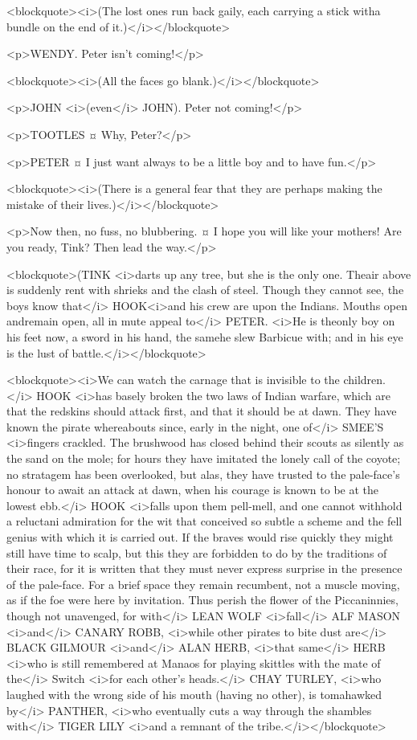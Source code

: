 <blockquote><i>(The lost ones run back gaily, each carrying a stick witha bundle on the end of it.)</i></blockquote>

<p>WENDY. Peter isn't coming!</p>

<blockquote><i>(All the faces go blank.)</i></blockquote>

<p>JOHN <i>(even</i> JOHN). Peter not coming!</p>

<p>TOOTLES ¤
Why, Peter?</p>

<p>PETER ¤
I just want always to be a little boy and to have fun.</p>

<blockquote><i>(There is a general fear that they are perhaps making the mistake of their lives.)</i></blockquote>

<p>Now then, no fuss, no blubbering.
¤
I hope you will like your mothers! Are you ready, Tink? Then lead the way.</p>

<blockquote>(TINK <i>darts up any tree, but she is the only one. Theair above is suddenly rent with shrieks and the clash of steel. Though they cannot see, the boys know that</i> HOOK<i>and his crew are upon the Indians. Mouths open andremain open, all in mute appeal to</i> PETER. <i>He is theonly boy on his feet now, a sword in his hand, the samehe slew Barbicue with; and in his eye is the lust of battle.</i></blockquote>

<blockquote><i>We can watch the carnage that is invisible to the children.</i> HOOK <i>has basely broken the two laws of Indian warfare, which are that the redskins should attack first, and that it should be at dawn. They have known the pirate whereabouts since, early in the night, one of</i> SMEE'S <i>fingers crackled. The brushwood has closed behind their scouts as silently as the sand on the mole; for hours they have imitated the lonely call of the coyote; no stratagem has been overlooked, but alas, they have trusted to the pale-face's honour to await an attack at dawn, when his courage is known to be at the lowest ebb.</i> HOOK <i>falls upon them pell-mell, and one cannot withhold a reluctani admiration for the wit that conceived so subtle a scheme and the fell genius with which it is carried out. If the braves would rise quickly they might still have time to scalp, but this they are forbidden to do by the traditions of their race, for it is written that they must never express surprise in the presence of the pale-face. For a brief space they remain recumbent, not a muscle moving, as if the foe were here by invitation. Thus perish the flower of the Piccaninnies, though not unavenged, for with</i> LEAN WOLF <i>fall</i> ALF MASON <i>and</i> CANARY ROBB, <i>while other pirates to bite dust are</i> BLACK GILMOUR <i>and</i> ALAN HERB, <i>that same</i> HERB <i>who is still remembered at Manaos for playing skittles with the mate of the</i> Switch <i>for each other's heads.</i> CHAY TURLEY, <i>who laughed with the wrong side of his mouth (having no other), is tomahawked by</i> PANTHER, <i>who eventually cuts a way through the shambles with</i> TIGER LILY <i>and a remnant of the tribe.</i></blockquote>

